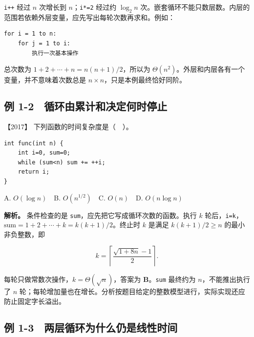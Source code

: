 \texttt{i++} 经过 \(n\) 次增长到 \(n\)；\texttt{i*=2} 经过约 \(\log_2n\) 次。嵌套循环不能只数层数。内层的范围若依赖外层变量，应先写出每轮次数再求和。例如：

\par\medskip\noindent
\begin{minipage}{\linewidth}
\begin{verbatim}
for i = 1 to n:
    for j = 1 to i:
        执行一次基本操作
\end{verbatim}
\end{minipage}\par\medskip

总次数为 \(1+2+\cdots+n=n(n+1)/2\)，所以为 \(\Theta(n^2)\)。外层和内层各有一个变量，并不意味着次数总是 \(n\times n\)，只是本例最终恰好同阶。


\subsection{例 1-2　循环由累计和决定何时停止}\label{ds-ex1-2}

\noindent{}【2017】 下列函数的时间复杂度是（　）。

\par\medskip\noindent
\begin{minipage}{\linewidth}
\begin{verbatim}
int func(int n) {
    int i=0, sum=0;
    while (sum<n) sum += ++i;
    return i;
}
\end{verbatim}
\end{minipage}\par\medskip

A. \(O(\log n)\)　B. \(O(n^{1/2})\)　C. \(O(n)\)　D. \(O(n\log n)\)


\textbf{解析。} 条件检查的是 \texttt{sum}，应先把它写成循环次数的函数。执行 \(k\) 轮后，\texttt{i=k}，\(\mathrm{sum}=1+2+\cdots+k=k(k+1)/2\)。终止时 \(k\) 是满足 \(k(k+1)/2\ge n\) 的最小非负整数，即

\[k=\left\lceil\frac{\sqrt{1+8n}-1}{2}\right\rceil.\]

每轮只做常数次操作，\(k=\Theta(\sqrt n)\)，答案为 \textbf{B}。\texttt{sum} 最终约为 \(n\)，不能推出执行了 \(n\) 轮；每轮增加量也在增长。分析按题目给定的整数模型进行，实际实现还应防止固定字长溢出。

\subsection{例 1-3　两层循环为什么仍是线性时间}\label{ds-ex1-3}

